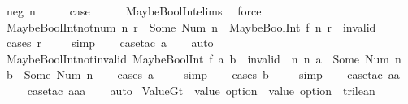 \begin{isabellebody}
\ {\isacharparenleft}neg\ n{\isacharparenright}\isanewline
\ \ \isamarkupfalse%
\ \isamarkupfalse%
\ {\isacharquery}case\isanewline
\ \ \ \ \isamarkupfalse%
\ MaybeBoolInt{\isachardot}elims\ \isamarkupfalse%
\ force\isanewline
{}\isamarkupfalse%
%
\endisatagproof
{\isafoldproof}%
%
\isadelimproof
\isanewline
%
\endisadelimproof
\isanewline
{}\isamarkupfalse%
\ MaybeBoolInt{\isacharunderscore}not{\isacharunderscore}num{\isacharunderscore}{}{\isacharcolon}\ {\isachardoublequoteopen}{\isasymforall}n{\isachardot}\ r\ {\isasymnoteq}\ Some\ {\isacharparenleft}Num\ n{\isacharparenright}\ {\isasymLongrightarrow}\ MaybeBoolInt\ f\ n\ r\ {\isacharequal}\ invalid{\isachardoublequoteclose}\isanewline
%
\isadelimproof
\ \ %
\endisadelimproof
%
\isatagproof
{}\isamarkupfalse%
\ {\isacharparenleft}cases\ r{\isacharparenright}\isanewline
\ \ \ \isamarkupfalse%
\ simp\isanewline
\ \ \isamarkupfalse%
\ {\isacharparenleft}case{\isacharunderscore}tac\ a{\isacharparenright}\isanewline
\ \ \isamarkupfalse%
\ auto%
\endisatagproof
{\isafoldproof}%
%
\isadelimproof
\isanewline
%
\endisadelimproof
\isanewline
{}\isamarkupfalse%
\ MaybeBoolInt{\isacharunderscore}not{\isacharunderscore}invalid{\isacharcolon}\ {\isachardoublequoteopen}MaybeBoolInt\ f\ a\ b\ {\isasymnoteq}\ invalid\ {\isacharequal}\ {\isacharparenleft}{\isasymexists}n\ n{\isacharprime}{\isachardot}\ a\ {\isacharequal}\ Some\ {\isacharparenleft}Num\ n{\isacharparenright}\ {\isasymand}\ b\ {\isacharequal}\ Some\ {\isacharparenleft}Num\ n{\isacharprime}{\isacharparenright}{\isacharparenright}{\isachardoublequoteclose}\isanewline
%
\isadelimproof
\ \ %
\endisadelimproof
%
\isatagproof
{}\isamarkupfalse%
\ {\isacharparenleft}cases\ a{\isacharparenright}\isanewline
\ \ \ \isamarkupfalse%
\ simp\isanewline
\ \ \isamarkupfalse%
\ {\isacharparenleft}cases\ b{\isacharparenright}\isanewline
\ \ \ \isamarkupfalse%
\ simp\isanewline
\ \ \isamarkupfalse%
\ {\isacharparenleft}case{\isacharunderscore}tac\ aa{\isacharparenright}\isanewline
\ \ \ \isamarkupfalse%
\ {\isacharparenleft}case{\isacharunderscore}tac\ aaa{\isacharparenright}\isanewline
\ \ \isamarkupfalse%
\ auto%
\endisatagproof
{\isafoldproof}%
%
\isadelimproof
\isanewline
%
\endisadelimproof
\isanewline
{}\isamarkupfalse%
\ ValueGt\ {\isacharcolon}{\isacharcolon}\ {\isachardoublequoteopen}value\ option\ {\isasymRightarrow}\ value\ option\ {\isasymRightarrow}\ trilean{\isachardoublequoteclose}\ \ \isanewline

\end{isabellebody}
